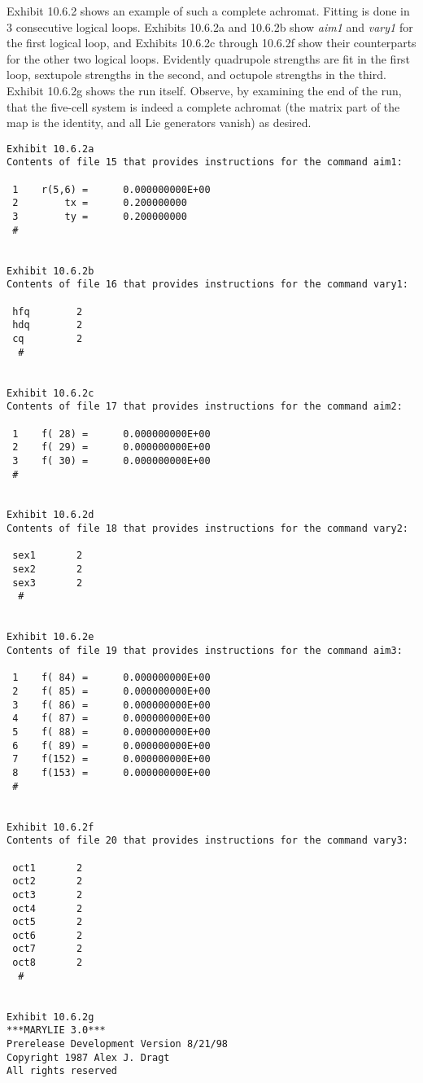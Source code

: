 Exhibit 10.6.2 shows an example of such a complete achromat.  Fitting is
done in 3 consecutive logical loops.  Exhibits 10.6.2a and 10.6.2b show
{\em aim1} and {\em vary1} for the first logical loop, and Exhibits
10.6.2c through 10.6.2f show their counterparts for the other two logical
loops.  Evidently quadrupole strengths are fit in the first loop,
sextupole strengths in the second, and octupole strengths in the third.
Exhibit 10.6.2g shows the \Mary run itself.  Observe, by examining the
end of the run, that the five-cell system is indeed a complete achromat
(the matrix part of the map is the identity, and all Lie generators
vanish) as desired.

\begin{footnotesize}
\begin{verbatim}
Exhibit 10.6.2a
Contents of file 15 that provides instructions for the command aim1:

 1    r(5,6) =      0.000000000E+00
 2        tx =      0.200000000
 3        ty =      0.200000000
 #


Exhibit 10.6.2b
Contents of file 16 that provides instructions for the command vary1:

 hfq        2
 hdq        2
 cq         2
  #


Exhibit 10.6.2c
Contents of file 17 that provides instructions for the command aim2:

 1    f( 28) =      0.000000000E+00
 2    f( 29) =      0.000000000E+00
 3    f( 30) =      0.000000000E+00
 #


Exhibit 10.6.2d
Contents of file 18 that provides instructions for the command vary2:

 sex1       2
 sex2       2
 sex3       2
  #


Exhibit 10.6.2e
Contents of file 19 that provides instructions for the command aim3:

 1    f( 84) =      0.000000000E+00
 2    f( 85) =      0.000000000E+00
 3    f( 86) =      0.000000000E+00
 4    f( 87) =      0.000000000E+00
 5    f( 88) =      0.000000000E+00
 6    f( 89) =      0.000000000E+00
 7    f(152) =      0.000000000E+00
 8    f(153) =      0.000000000E+00
 #


Exhibit 10.6.2f
Contents of file 20 that provides instructions for the command vary3:

 oct1       2
 oct2       2
 oct3       2
 oct4       2
 oct5       2
 oct6       2
 oct7       2
 oct8       2
  #


Exhibit 10.6.2g
***MARYLIE 3.0***
Prerelease Development Version 8/21/98
Copyright 1987 Alex J. Dragt
All rights reserved


\end{verbatim}
\end{footnotesize}
